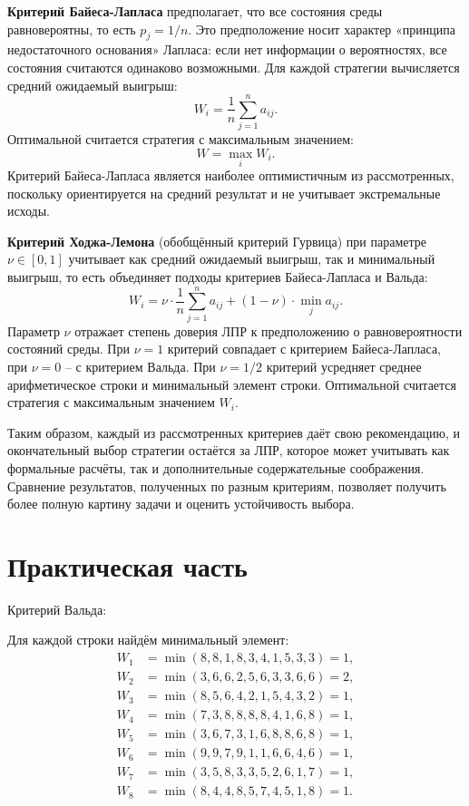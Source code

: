 \textbf{Критерий Байеса-Лапласа} предполагает, что все состояния среды равновероятны, то есть $p_j = 1/n$. Это предположение носит характер «принципа недостаточного основания» Лапласа: если нет информации о вероятностях, все состояния считаются одинаково возможными. Для каждой стратегии вычисляется средний ожидаемый выигрыш:
\[
W_i = \frac{1}{n} \sum_{j=1}^{n} a_{ij}.
\]
Оптимальной считается стратегия с максимальным значением:
\[
W = \max_{i} W_i.
\]
Критерий Байеса-Лапласа является наиболее оптимистичным из рассмотренных, поскольку ориентируется на средний результат и не учитывает экстремальные исходы.

\textbf{Критерий Ходжа-Лемона} (обобщённый критерий Гурвица) при параметре $\nu \in [0,1]$ учитывает как средний ожидаемый выигрыш, так и минимальный выигрыш, то есть объединяет подходы критериев Байеса-Лапласа и Вальда:
\[
W_i = \nu \cdot \frac{1}{n} \sum_{j=1}^{n} a_{ij} + (1-\nu) \cdot \min_{j} a_{ij}.
\]
Параметр $\nu$ отражает степень доверия ЛПР к предположению о равновероятности состояний среды. При $\nu = 1$ критерий совпадает с критерием Байеса-Лапласа, при $\nu = 0$ -- с критерием Вальда. При $\nu = 1/2$ критерий усредняет среднее арифметическое строки и минимальный элемент строки. Оптимальной считается стратегия с максимальным значением $W_i$.

Таким образом, каждый из рассмотренных критериев даёт свою рекомендацию, и окончательный выбор стратегии остаётся за ЛПР, которое может учитывать как формальные расчёты, так и дополнительные содержательные соображения. Сравнение результатов, полученных по разным критериям, позволяет получить более полную картину задачи и оценить устойчивость выбора.









\clearpage

\section{Практическая часть}

Критерий Вальда:

Для каждой строки найдём минимальный элемент:
\begin{align*}
W_1 &= \min(8,8,1,8,3,4,1,5,3,3) = 1, \\
W_2 &= \min(3,6,6,2,5,6,3,3,6,6) = 2, \\
W_3 &= \min(8,5,6,4,2,1,5,4,3,2) = 1, \\
W_4 &= \min(7,3,8,8,8,8,4,1,6,8) = 1, \\
W_5 &= \min(3,6,7,3,1,6,8,8,6,8) = 1, \\
W_6 &= \min(9,9,7,9,1,1,6,6,4,6) = 1, \\
W_7 &= \min(3,5,8,3,3,5,2,6,1,7) = 1, \\
W_8 &= \min(8,4,4,8,5,7,4,5,1,8) = 1.
\end{align*}

